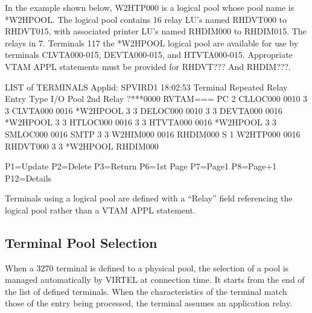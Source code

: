 \documentclass[letterpaper,10pt,english]{sphinxmanual}
\begin{document}
In the example shown below, W2HTP000 is a logical pool whose pool name is *W2HPOOL. The logical pool contains 16 relay LU’s named RHDVT000 to RHDVT015, with associated printer LU’s named RHDIM000 to RHDIM015. The relays in 7. Terminals 117 the *W2HPOOL logical pool are available for use by terminals CLVTA000-015, DEVTA000-015, and HTVTA000-015. Appropriate VTAM APPL statements must be provided for RHDVT??? And RHDIM???.

\begin{sphinxVerbatim}[commandchars=\\\{\}]
LIST of TERMINALS \PYGZhy{}\PYGZhy{}\PYGZhy{}\PYGZhy{}\PYGZhy{}\PYGZhy{}\PYGZhy{}\PYGZhy{}\PYGZhy{}\PYGZhy{}\PYGZhy{}\PYGZhy{}\PYGZhy{}\PYGZhy{}\PYGZhy{}\PYGZhy{}\PYGZhy{}\PYGZhy{}\PYGZhy{}\PYGZhy{}\PYGZhy{}\PYGZhy{}\PYGZhy{}\PYGZhy{}\PYGZhy{}\PYGZhy{}\PYGZhy{}\PYGZhy{}\PYGZhy{}\PYGZhy{}\PYGZhy{}\PYGZhy{}\PYGZhy{}\PYGZhy{} Applid: SPVIRD1 18:02:53
Terminal Repeated    Relay       Entry    Type I/O  Pool      2nd Relay
?***0000             RVTAM===    PC       2
CLLOC000 0010                             3    3
CLVTA000 0016        *W2HPOOL             3    3
DELOC000 0010                             3    3
DEVTA000 0016        *W2HPOOL             3    3
HTLOC000 0016                             3    3
HTVTA000 0016        *W2HPOOL             3    3
SMLOC000 0016                    SMTP     3    3
W2HIM000 0016        RHDIM000             S    1
W2HTP000 0016        RHDVT000             3    3    *W2HPOOL   RHDIM000



P1=Update            P2=Delete            P3=Return             P6=1st Page
P7=Page\PYGZhy{}1            P8=Page+1            P12=Details
\end{sphinxVerbatim}


Terminals using a logical pool are defined with a “Relay” field referencing the logical pool rather than a VTAM APPL statement.


\subsection{Terminal Pool Selection}
\label{\detokenize{connectivity_guide:index-143}}\label{\detokenize{connectivity_guide:terminal-pool-selection}}
When a 3270 terminal is defined to a physical pool, the selection of a pool is managed automatically by VIRTEL at connection time. It starts from the end of the list of defined terminals. When the characteristics of the terminal match those of the entry being processed, the terminal assumes an application relay.
\end{document}
